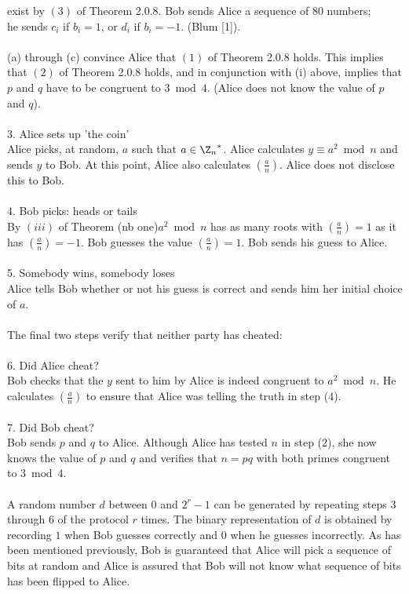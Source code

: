 \indent exist by $(3)$ of Theorem 2.0.8. Bob sends Alice a sequence of 80 numbers;\\
\indent he sends $c_i$ if $b_i = 1$, or $d_i$ if $b_i = -1$. (Blum [1]).\\
\\
(a) through (c) convince Alice that $(1)$ of Theorem 2.0.8 holds. This implies that $(2)$ of Theorem 2.0.8 holds, and in conjunction with (i) above, implies that $p$ and $q$ have to be congruent to $3 \bmod 4$. (Alice does not know the value of $p$ and $q$).\\
\\
3. Alice sets up 'the coin'\\
Alice picks, at random, $a$ such that $a \in {\Z_{n}}^*$. Alice calculates $y \equiv a^2 \bmod n$ and sends $y$ to Bob. At this point, Alice also calculates $\left(\frac{a}{n}\right)$. Alice does not disclose this to Bob.\\
\\
4. Bob picks: heads or tails\\
By $(iii)$ of Theorem (nb one)$a^2 \bmod n$ has as many roots with $\left(\frac{a}{n}\right) = 1$ as it has $\left(\frac{a}{n}\right) = -1$. Bob guesses the value $\left(\frac{a}{n}\right) = 1$. Bob sends his guess to Alice.\\
\\
5. Somebody wins, somebody loses\\
Alice tells Bob whether or not his guess is correct and sends him her initial choice of $a$.\\
\\
The final two steps verify that neither party has cheated:\\
\\
6. Did Alice cheat?\\
Bob checks that the $y$ sent to him by Alice is indeed congruent to $a^2 \bmod n$. He calculates $\left(\frac{a}{n}\right)$ to ensure that Alice was telling the truth in step (4).\\
\\
7. Did Bob cheat?\\
Bob sends $p$ and $q$ to Alice. Although Alice has tested $n$ in step (2), she now knows the value of $p$ and $q$ and verifies that $n = pq$ with both primes congruent to $3 \bmod 4$.\\ 
\\
A random number $d$ between $0$ and $2^r - 1$ can be generated by repeating steps 3 through 6 of the protocol $r$ times. The binary representation of $d$ is obtained by recording $1$ when Bob guesses correctly and $0$ when he guesses incorrectly. As has been mentioned previously, Bob is guaranteed that Alice will pick a sequence of bits at random and Alice is assured that Bob will not know what sequence of bits has been flipped to Alice.\\  
